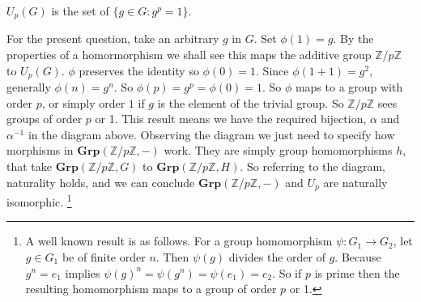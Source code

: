\documentclass{article}
\begin{document}
$U_p(G)$ is the set of $\{g \in G\colon g^p = 1\}$.

For the present question, take an arbitrary $g$ in $G$. Set $\phi(1) = g$. By the properties of a homormorphism we shall see this maps the additive group $\mathds{Z}/p\mathds{Z}$ to $U_p(G)$. $\phi$ preserves the identity so $\phi(0) = 1$. Since $\phi(1 + 1) = g^2$, generally $\phi(n) = g^n$. So $\phi(p) = g^p = \phi(0) = 1$. So $\phi$ maps to a group with order $p$, or simply order $1$ if $g$ is the element of the trivial group. So $\mathds{Z}/p\mathds{Z}$ sees groups of order $p$ or 1. This result means we have the required bijection, $\alpha$ and $\alpha^{-1}$ in the diagram above. Observing the diagram we just need to specify how morphisms in $\mathbf{Grp}(\mathds{Z}/p\mathds{Z}, -)$ work. They are simply group homomorphisms $h$, that take $\mathbf{Grp}(\mathds{Z}/p\mathds{Z}, G)$ to $\mathbf{Grp}(\mathds{Z}/p\mathds{Z}, H)$. So referring to the diagram, naturality holds, and we can conclude $\mathbf{Grp}(\mathds{Z}/p\mathds{Z}, -)$ and $U_p$ are naturally isomorphic. \footnote{A well known result is as follows. For a group homomorphism $\psi: G_1 \rightarrow G_2$, let $g \in G_1$ be of finite order $n$. Then $\psi(g)$ divides the order of $g$. Because $g^n = e_1$ implies $\psi(g)^n = \psi(g^n) = \psi(e_1) = e_2$. So if $p$ is prime then the resulting homomorphism maps to a group of order $p$ or 1.}
\end{document}
